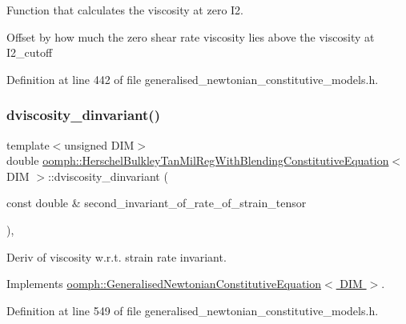 Function that calculates the viscosity at zero I2. 

Offset by how much the zero shear rate viscosity lies above the viscosity at I2\+\_\+cutoff 

Definition at line 442 of file generalised\+\_\+newtonian\+\_\+constitutive\+\_\+models.\+h.

\mbox{\label{classoomph_1_1HerschelBulkleyTanMilRegWithBlendingConstitutiveEquation_a62a903bc649a75dd1042923e624e2ea4}} 
\subsubsection{\texorpdfstring{dviscosity\+\_\+dinvariant()}{dviscosity\_dinvariant()}}
{\footnotesize\ttfamily template$<$unsigned D\+IM$>$ \\
double \hyperlink{classoomph_1_1HerschelBulkleyTanMilRegWithBlendingConstitutiveEquation}{oomph\+::\+Herschel\+Bulkley\+Tan\+Mil\+Reg\+With\+Blending\+Constitutive\+Equation}$<$ D\+IM $>$\+::dviscosity\+\_\+dinvariant (\begin{DoxyParamCaption}\item[{const double \&}]{second\+\_\+invariant\+\_\+of\+\_\+rate\+\_\+of\+\_\+strain\+\_\+tensor }\end{DoxyParamCaption})\hspace{0.3cm}{\ttfamily [inline]}, {\ttfamily [virtual]}}



Deriv of viscosity w.\+r.\+t. strain rate invariant. 



Implements \hyperlink{classoomph_1_1GeneralisedNewtonianConstitutiveEquation_ad0164e6ca57cc986048346e12c4d353a}{oomph\+::\+Generalised\+Newtonian\+Constitutive\+Equation$<$ D\+I\+M $>$}.



Definition at line 549 of file generalised\+\_\+newtonian\+\_\+constitutive\+\_\+models.\+h.

